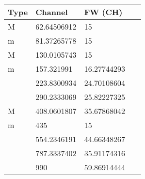 \begin{table}[H]
    \centering
    \begin{tabular}{|l|l|l|l|}
    \hline
        Type & Channel & FW (CH) & ~ \\ \hline
        M & 62.64506912 & 15 & ~ \\ \hline
        m & 81.37265778 & 15 & ~ \\ \hline
        M & 130.0105743 & 15 & ~ \\ \hline
        m & 157.321991 & 16.27744293 & ~ \\ \hline
          & 223.8300934 & 24.70108604 & ~ \\ \hline
          & 290.2333069 & 25.82227325 & ~ \\ \hline
        M & 408.0601807 & 35.67868042 & ~ \\ \hline
        m & 435 & 15 & ~ \\ \hline
          & 554.2346191 & 44.66348267 & ~ \\ \hline
          & 787.3337402 & 35.91174316 & ~ \\ \hline
          & 990 & 59.86914444 & ~ \\ \hline
    \end{tabular}
\end{table}